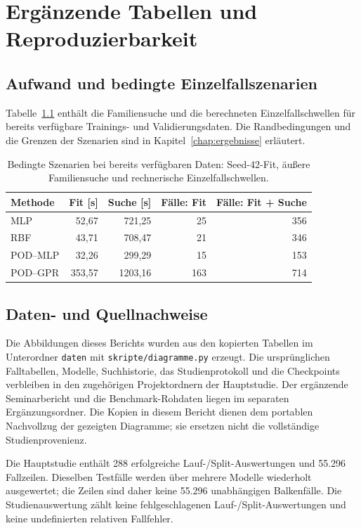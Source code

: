 \chapter{Ergänzende Tabellen und Reproduzierbarkeit}
\section{Aufwand und bedingte Einzelfallszenarien}
Tabelle~\ref{tab:break} enthält die Familiensuche und die berechneten Einzelfallschwellen für bereits verfügbare Trainings- und Validierungsdaten. Die Randbedingungen und die Grenzen der Szenarien sind in Kapitel~\ref{chap:ergebnisse} erläutert.
\begin{table}[htbp]\centering\caption{Bedingte Szenarien bei bereits verfügbaren Daten: Seed-42-Fit, äußere Familiensuche und rechnerische Einzelfallschwellen.}\label{tab:break}
\small\begin{tabular}{lrrrr}\toprule Methode & Fit [s] & Suche [s] & Fälle: Fit & Fälle: Fit + Suche\\\midrule
MLP & 52,67 & 721,25 & 25 & 356\\
RBF & 43,71 & 708,47 & 21 & 346\\
POD--MLP & 32,26 & 299,29 & 15 & 153\\
POD--GPR & 353,57 & 1203,16 & 163 & 714\\\bottomrule\end{tabular}\end{table}

\section{Daten- und Quellnachweise}
Die Abbildungen dieses Berichts wurden aus den kopierten Tabellen im Unterordner \texttt{daten} mit \texttt{skripte/diagramme.py} erzeugt. Die ursprünglichen Falltabellen, Modelle, Suchhistorie, das Studienprotokoll und die Checkpoints verbleiben in den zugehörigen Projektordnern der Hauptstudie. Der ergänzende Seminarbericht und die Benchmark-Rohdaten liegen im separaten Ergänzungsordner. Die Kopien in diesem Bericht dienen dem portablen Nachvollzug der gezeigten Diagramme; sie ersetzen nicht die vollständige Studienprovenienz.

Die Hauptstudie enthält 288 erfolgreiche Lauf-/Split-Auswertungen und 55.296 Fallzeilen. Dieselben Testfälle werden über mehrere Modelle wiederholt ausgewertet; die Zeilen sind daher keine 55.296 unabhängigen Balkenfälle. Die Studienauswertung zählt keine fehlgeschlagenen Lauf-/Split-Auswertungen und keine undefinierten relativen Fallfehler.
